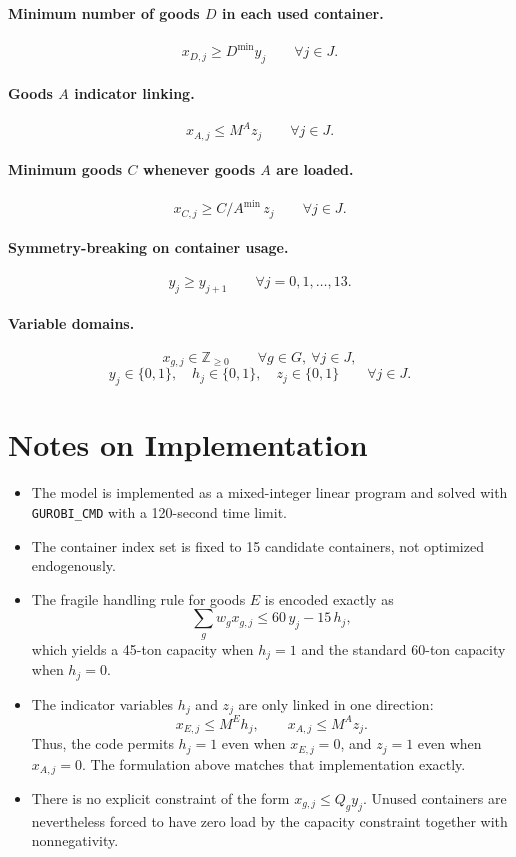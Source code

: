 \paragraph{Minimum number of goods \(D\) in each used container.}
\[
x_{D,j} \ge D^{\min} y_j
\qquad \forall j \in J.
\]

\paragraph{Goods \(A\) indicator linking.}
\[
x_{A,j} \le M^A z_j
\qquad \forall j \in J.
\]

\paragraph{Minimum goods \(C\) whenever goods \(A\) are loaded.}
\[
x_{C,j} \ge C/A^{\min}\, z_j
\qquad \forall j \in J.
\]

\paragraph{Symmetry-breaking on container usage.}
\[
y_j \ge y_{j+1}
\qquad \forall j=0,1,\dots,13.
\]

\paragraph{Variable domains.}
\[
x_{g,j} \in \mathbb{Z}_{\ge 0}
\qquad \forall g \in G,\ \forall j \in J,
\]
\[
y_j \in \{0,1\},\quad h_j \in \{0,1\},\quad z_j \in \{0,1\}
\qquad \forall j \in J.
\]

\section*{Notes on Implementation}

\begin{itemize}
    \item The model is implemented as a mixed-integer linear program and solved with \texttt{GUROBI\_CMD} with a 120-second time limit.
    \item The container index set is fixed to 15 candidate containers, not optimized endogenously.
    \item The fragile handling rule for goods $E$ is encoded exactly as
    \[
    \sum_g w_g x_{g,j} \le 60\, y_j - 15\, h_j,
    \]
    which yields a 45-ton capacity when $h_j=1$ and the standard 60-ton capacity when $h_j=0$.
    \item The indicator variables $h_j$ and $z_j$ are only linked in one direction:
    \[
    x_{E,j} \le M^E h_j,\qquad x_{A,j} \le M^A z_j.
    \]
    Thus, the code permits $h_j=1$ even when $x_{E,j}=0$, and $z_j=1$ even when $x_{A,j}=0$. The formulation above matches that implementation exactly.
    \item There is no explicit constraint of the form $x_{g,j} \le Q_g y_j$. Unused containers are nevertheless forced to have zero load by the capacity constraint together with nonnegativity.
\end{itemize}
